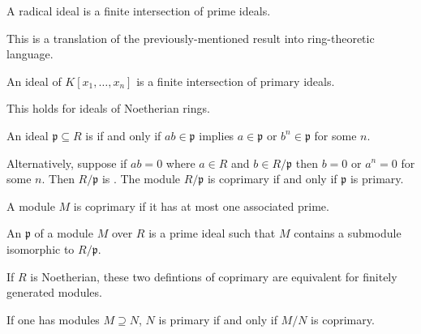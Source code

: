 \documentclass [11 pt, oneside, margin = 1 in] {article}
\begin{document}
\begin{theorem}[ ]\label{}\index{}\text{}
A radical ideal is a finite intersection of prime ideals.
\end{theorem}

This is a translation of the previously-mentioned result into ring-theoretic language.
\begin{theorem}[Lasker]\label{}\index{}\text{}
An ideal of $K[x_1,\hdots, x_n]$ is a finite intersection of primary ideals.
\end{theorem}
\begin{theorem}[Noether]\label{}\index{}\text{}
This holds for ideals of Noetherian rings.
\end{theorem}

\begin{definition}\label{}\text{}
An ideal $\mathfrak{p}\subseteq R$ is  if and only if $ab\in \mathfrak{p}$ implies $a\in \mathfrak{p}$ or $b^n\in \mathfrak{p}$ for some $n$.
\end{definition}

Alternatively, suppose if $ab=0$ where $a\in R$ and $b\in R/\mathfrak{p}$ then $b=0$ or $a^n=0$ for some $n$. Then $R/\mathfrak{p}$ is . The module $R/\mathfrak{p}$ is coprimary if and only if $\mathfrak{p}$ is primary.

\begin{definition}[ ]\label{}\text{}
A module $M$ is coprimary if it has at most one associated prime.
\end{definition}

\begin{definition}[ ]\label{}\text{}
An  $\mathfrak{p}$ of a module $M$ over $R$ is a prime ideal such that $M$ contains a submodule isomorphic to $R/\mathfrak{p}$.
\end{definition}
\begin{remark}
If $R$ is Noetherian, these two defintions of coprimary are equivalent for finitely generated modules.
\end{remark}

If one has modules $M\supseteq N$, $N$ is primary if and only if $M/N$ is coprimary.
\end{document}
